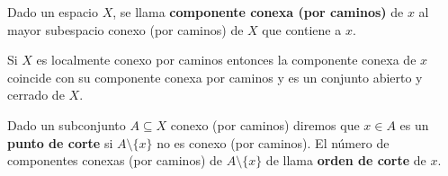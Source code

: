 \documentclass[GTS.tex]{subfiles}
\begin{document}
\begin{defi}
Dado un espacio $X$, se llama \textbf{componente conexa (por caminos)} de $x$ al mayor subespacio conexo (por caminos) de $X$ que contiene a $x$.
\end{defi}

\begin{prop}
Si $X$ es localmente conexo por caminos entonces la componente conexa de $x$ coincide con su componente conexa por caminos y es un conjunto abierto y cerrado de $X$.
\end{prop}

\begin{defi}Dado un subconjunto $A\subseteq X$ conexo (por caminos) diremos que $x\in A$ es un \textbf{punto de corte} si $A\setminus\{x\}$ no es conexo (por caminos). El número de componentes conexas (por caminos) de   $A\setminus\{x\}$ de llama \textbf{orden de corte} de $x$.
\end{defi}
\end{document}
